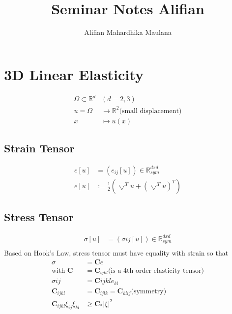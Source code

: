 \documentclass[a4paper,12pt]{article}
\title{Seminar Notes Alifian}
\author{Alifian Mahardhika Maulana}
\newcommand{\R}{\mathbb{R}}
\begin{document}
\maketitle
\section{3D Linear Elasticity}
\begin{equation}\nonumber
\begin{aligned}
\Omega \subset \R^d & (d=2,3) \\
u = \Omega & \rightarrow \R^2 \text{(small displacement)}\\
x & \mapsto u(x)
\end{aligned}
\end{equation}
\subsection{Strain Tensor}
\begin{equation}
\begin{aligned}
e[u] & = (e_{ij}[u]) \in \R^{d x d}_{sym}\\
e[u] & := \frac{1}{2} (\bigtriangledown^Tu + (\bigtriangledown^Tu)^T)
\end{aligned}
\end{equation}
\subsection{Stress Tensor}
\begin{equation}
\begin{aligned}
\sigma[u] &= (\sigma{ij}[u]) \in \R^{d x d}_{sym}\\
\end{aligned}
\end{equation}
Based on Hook's Law, stress tensor must have equality with strain so that
\begin{equation}\nonumber
\begin{aligned}
\sigma &= \textbf{C} e\\
\text{with } \textbf{C} &= \textbf{C}_{ijkl} \text{(is a 4th order elasticity tensor)}\\
\sigma{ij} &= \textbf{C}{ijkl} e_{kl}\\
\textbf{C}_{ijkl} &= \textbf{C}_{ijlk} = \textbf{C}_{klij} \text{(symmetry)}\\
\textbf{C}_{ijkl} \xi_{ij} \xi_{kl} & \geq \textbf{C}_* |\xi|^2
\end{aligned}
\end{equation}
\end{document}
